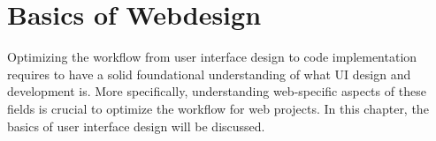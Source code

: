 \newpage
\section{Basics of Webdesign}
Optimizing the workflow from user interface design to code implementation requires to have a solid
foundational understanding of what UI design and development is. More specifically, understanding
web-specific aspects of these fields is crucial to optimize the workflow for web projects. In this
chapter, the basics of user interface design will be discussed.





